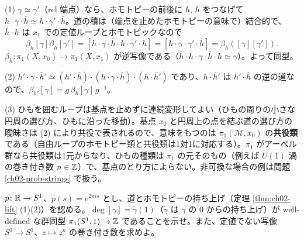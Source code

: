 \begin{solution}
(1) $\gamma\simeq\gamma'$（rel 端点）なら、ホモトピーの前後に $h$, $\bar h$ をつなげて $h\cdot\gamma\cdot\bar h\simeq h\cdot\gamma'\cdot\bar h$。道の積は（端点を止めたホモトピーの意味で）結合的で、$\bar h\cdot h$ は $x_1$ での定値ループとホモトピックなので
\[
\beta_h[\gamma]\beta_h[\gamma']=[h\cdot\gamma\cdot\bar h\cdot h\cdot\gamma'\cdot\bar h]=[h\cdot\gamma\cdot\gamma'\cdot\bar h]=\beta_h([\gamma][\gamma']).
\]
$\beta_{\bar h}\colon\pi_1(X,x_0)\to\pi_1(X,x_1)$ が逆写像である（$\bar h\cdot h\cdot\gamma\cdot\bar h\cdot h\simeq\gamma$）。よって同型。

(2) $h'\cdot\gamma\cdot\bar h'\simeq(h'\cdot\bar h)\cdot(h\cdot\gamma\cdot\bar h)\cdot(h\cdot\bar h')$ であり、$h\cdot\bar h'$ は $h'\cdot\bar h$ の逆の道なので、$\beta_{h'}[\gamma]=g\,\beta_h[\gamma]\,g^{-1}$。

(3) ひもを囲むループは基点を止めずに連続変形してよい（ひもの周りの小さな円周の選び方、ひもに沿った移動）。基点 $x_0$ と円周上の点を結ぶ道の選び方の曖昧さは (2) により共役で表されるので、意味をもつのは $\pi_1(\mathcal M,x_0)$ の\textbf{共役類}である（自由ループのホモトピー類と共役類は1対1に対応する）。$\pi_1$ がアーベル群なら共役類は1元からなり、ひもの種類は $\pi_1$ の元そのもの（例えば $U(1)$ 渦の巻き付き数 $n\in\mathbb{Z}$）で、基点のとり方によらない。非可換な場合の例は問題 \ref{ch02-prob-strings} で扱う。
\end{solution}

\begin{problem}[難易度 B]\label{ch02-prob-S1}
$p\colon\mathbb{R}\to S^1$、$p(s)=e^{2\pi is}$ とし、道とホモトピーの持ち上げ（定理 \ref{thm:ch02-lift} (1)(2)）を認める。$\deg[\gamma]=\tilde\gamma(1)$（$\tilde\gamma$ は $\gamma$ の $0$ からの持ち上げ）が well-defined な群同型 $\pi_1(S^1,1)\to\mathbb{Z}$ であることを示せ。また、定値でない写像 $S^1\to S^1$、$z\mapsto z^n$ の巻き付き数を求めよ。
\end{problem}

